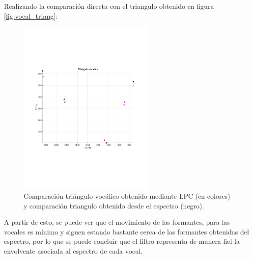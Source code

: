 	Realizando la comparación directa con el triangulo obtenido en figura \ref{fig:vocal_triang}:
	\begin{figure}[H]
		\center
		\includegraphics[width=0.6\textwidth,clip, trim = {1.9cm 6.8cm 2.3cm 7cm}]{../plots/vocalico_comp.pdf}
		\caption{Comparación triángulo vocálico obtenido mediante LPC (en colores) y comparación triangulo obtenido desde el espectro (negro).}
		\label{fig:vocal_triang_LPC_comparative}
	\end{figure}
	
	A partir de esto, se puede ver que el movimiento de las formantes, para las vocales es mínimo y siguen estando bastante cerca de las formantes obtenidas del espectro, por lo que se puede concluir que el filtro representa de manera fiel la envolvente asociada al espectro de cada vocal.
	